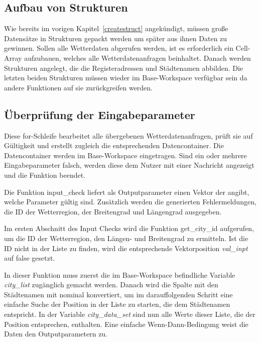 \subsection{Aufbau von Strukturen}
 
Wie bereits im vorigen Kapitel~\ref{createstruct} angekündigt, müssen große Datensätze in Strukturen gepackt werden um später aus ihnen Daten zu gewinnen. Sollen alle Wetterdaten abgerufen werden, ist es erforderlich ein Cell-Array aufzubauen, welches alle Wetterdatenanfragen beinhaltet. Danach werden Strukturen angelegt, die die Registeradressen und Städtenamen abbilden. Die letzten beiden Strukturen müssen wieder im Base-Workspace verfügbar sein da andere Funktionen auf sie zurückgreifen werden.
\subsection{Überprüfung der Eingabeparameter}

Diese for-Schleife bearbeitet alle übergebenen Wetterdatenanfragen, prüft sie auf Gültigkeit und erstellt zugleich die entsprechenden Datencontainer. Die Datencontainer werden im Base-Workspace eingetragen. Sind ein oder mehrere Eingabeparameter falsch, werden diese dem Nutzer mit einer Nachricht angezeigt und die Funktion beendet.

Die Funktion \textsf{input\_check} liefert als Outputparameter einen Vektor der angibt, welche Parameter gültig sind. Zusätzlich werden die generierten Fehlermeldungen, die ID der Wetterregion, der Breitengrad und Längengrad ausgegeben. 

Im ersten Abschnitt des Input Checks wird die Funktion \textsf{get\_city\_id} aufgerufen, um die ID der Wetterregion, den Längen- und Breitengrad zu ermitteln. Ist die ID nicht in der Liste zu finden, wird die entsprechende Vektorposition \textit{val\_inpt} auf false gesetzt.  

In dieser Funktion muss zuerst die im Base-Workspace befindliche Variable \textit{city\_list} zugänglich gemacht werden. Danach wird die Spalte mit den Städtenamen mit \textsf{nominal} konvertiert, um im darauffolgenden Schritt eine einfache Suche der Position in der Liste zu starten, die dem Städtenamen entspricht. In der Variable \textit{city\_data\_set} sind nun alle Werte dieser Liste, die der Position entsprechen, enthalten. Eine einfache Wenn-Dann-Bedingung weist die Daten den Outputparametern zu.   

